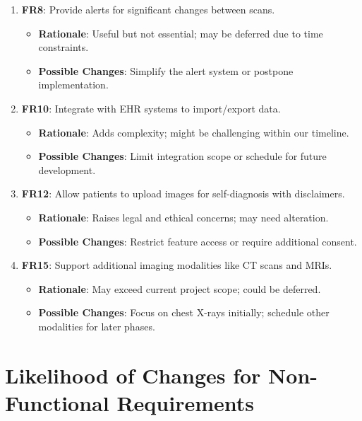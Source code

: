 \documentclass[12pt]{article}
\begin{document}
\begin{enumerate}[resume]
    \item \textbf{FR8}: Provide alerts for significant changes between scans.
    \begin{itemize}[label=-]
        \item \textbf{Rationale}: Useful but not essential; may be deferred due to time constraints.
        \item \textbf{Possible Changes}: Simplify the alert system or postpone implementation.
    \end{itemize}

    \item \textbf{FR10}: Integrate with EHR systems to import/export data.
    \begin{itemize}[label=-]
        \item \textbf{Rationale}: Adds complexity; might be challenging within our timeline.
        \item \textbf{Possible Changes}: Limit integration scope or schedule for future development.
    \end{itemize}

    \item \textbf{FR12}: Allow patients to upload images for self-diagnosis with disclaimers.
    \begin{itemize}[label=-]
        \item \textbf{Rationale}: Raises legal and ethical concerns; may need alteration.
        \item \textbf{Possible Changes}: Restrict feature access or require additional consent.
    \end{itemize}

    \item \textbf{FR15}: Support additional imaging modalities like CT scans and MRIs.
    \begin{itemize}[label=-]
        \item \textbf{Rationale}: May exceed current project scope; could be deferred.
        \item \textbf{Possible Changes}: Focus on chest X-rays initially; schedule other modalities for later phases.
    \end{itemize}
\end{enumerate}

\section{Likelihood of Changes for Non-Functional Requirements}
\end{document}
